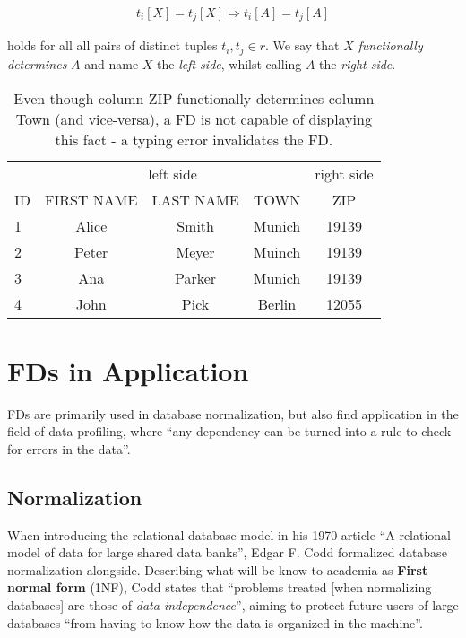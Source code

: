 \begin{align}
    t_i[X] = t_j[X] \Rightarrow t_i[A] = t_j[A] \label{eq:fd-condition}
\end{align}

holds for all all pairs of distinct tuples \(t_i,t_j \in r\).\cite[p.~21]{ABE19}
We say that \(X\) \emph{functionally determines} \(A\)\cite[p.~43]{MAI83} and name \(X\) the \emph{left side}, whilst calling \(A\) the \emph{right side}.\\

\begin{table}[ht]
    \centering
    \begin{tabular}{lcccc}
        \toprule
        & \multicolumn{3}{c}{left side} & \multicolumn{1}{c}{right side} \\ \cmidrule(lr{.75em}){2-3} \cmidrule(lr{.75em}){4-5}
        ID & FIRST NAME & LAST NAME & TOWN & ZIP \\
        \midrule
        1 & Alice & Smith & Munich & 19139 \\
        2 & Peter& Meyer & Muinch & 19139 \\
        3 & Ana & Parker & Munich & 19139  \\
        4 & John & Pick & Berlin & 12055 \\
        \bottomrule
    \end{tabular}
    \caption{Even though column ZIP functionally determines column Town (and vice-versa), a FD is not capable of displaying this fact - a typing error invalidates the FD.}
    \label{tab:example-afd-necessity}
\end{table}


\section{FDs in Application}
FDs are primarily used in database normalization,\cite[p.~1]{CAR16} but also find application in the field of data profiling, where ``any dependency can be turned into a rule to check for errors in the data''.\cite[p.~9]{ABE19}


\subsection{Normalization}
When introducing the relational database model in his 1970 article ``A relational model of data for large shared data banks'', Edgar F. Codd formalized database normalization alongside.\cite{COD70}
Describing what will be know to academia as \textbf{First normal form} (1NF), Codd states that ``problems treated [when normalizing databases] are those of \emph{data independence}'', aiming to protect future users of large databases ``from having to know how the data is organized in the machine''. \cite[p.~1]{COD70} \\

